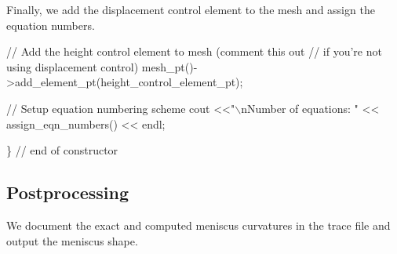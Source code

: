Finally, we add the displacement control element to the mesh and assign the equation numbers.


\begin{DoxyCodeInclude}

 \textcolor{comment}{// Add the height control element to mesh (comment this out}
 \textcolor{comment}{// if you're not using displacement control)}
 mesh\_pt()->add\_element\_pt(height\_control\_element\_pt);
 
 \textcolor{comment}{// Setup equation numbering scheme}
 cout <<\textcolor{stringliteral}{"\(\backslash\)nNumber of equations: "} << assign\_eqn\_numbers() << endl; 

\} \textcolor{comment}{// end of constructor}

\end{DoxyCodeInclude}




 

\hypertarget{index_post}{}\subsection{Postprocessing}\label{index_post}
We document the exact and computed meniscus curvatures in the trace file and output the meniscus shape.


